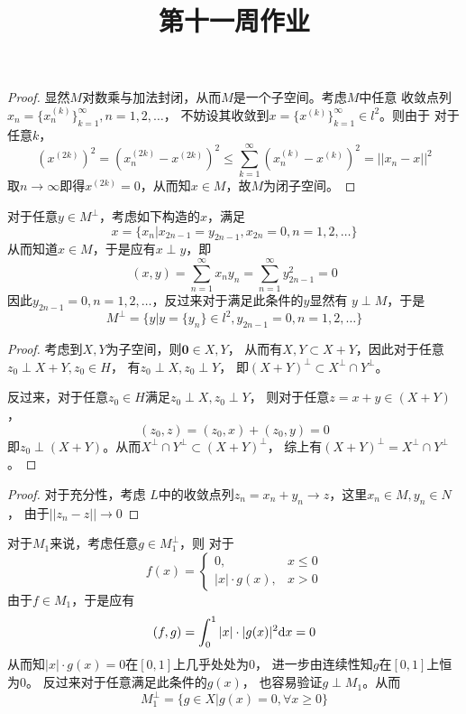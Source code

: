 \documentclass[cn]{homework}
\title{第十一周作业}
\begin{document}
    \maketitle

    \problem
    \begin{proof}
        显然$M$对数乘与加法封闭，从而$M$是一个子空间。考虑$M$中任意
        收敛点列$x_n=\{x_n^{(k)}\}_{k=1}^\infty,n=1,2,\ldots$，
        不妨设其收敛到$x=\{x^{(k)}\}_{k=1}^\infty\in l^2$。则由于
        对于任意$k$，
        \[\left(x^{(2k)}\right)^2=\left(x_n^{(2k)}-x^{(2k)}\right)^2
        \leq\sum_{k=1}^\infty \left(x_n^{(k)}-x^{(k)}\right)^2
        =||x_n-x||^2\]
        取$n\to\infty$即得$x^{(2k)}=0$，从而知$x\in M$，故$M$为闭子空间。
    \end{proof}

    对于任意$y\in M^\perp$，考虑如下构造的$x$，满足
    \[x=\{x_n|x_{2n-1}=y_{2n-1},x_{2n}=0,n=1,2,\ldots\}\]
    从而知道$x\in M$，于是应有$x\perp y$，即
    \[(x,y)=\sum_{n=1}^\infty x_ny_n=\sum_{n=1}^\infty y_{2n-1}^2=0\]
    因此$y_{2n-1}=0,n=1,2,\ldots$，反过来对于满足此条件的$y$显然有
    $y\perp M$，于是
    \[M^\perp=\{y|y=\{y_n\}\in l^2,y_{2n-1}=0,n=1,2,\ldots\}\]

    \problem
    \begin{proof}
        考虑到$X,Y$为子空间，则$\boldsymbol 0\in X,Y$，
        从而有$X,Y\subset X+Y$，因此对于任意$z_0\perp X+Y,z_0\in H$，
        有$z_0\perp X,z_0\perp Y$，
        即$(X+Y)^\perp\subset X^\perp\cap Y^\perp$。

        反过来，对于任意$z_0\in H$满足$z_0\perp X,z_0\perp Y$，
        则对于任意$z=x+y\in (X+Y)$，
        \[(z_0,z)=(z_0,x)+(z_0,y)=0\]
        即$z_0\perp (X+Y)$。从而$X^\perp\cap Y^\perp\subset (X+Y)^\perp$，
        综上有$(X+Y)^\perp=X^\perp\cap Y^\perp$。
    \end{proof}

    \problem
    \begin{proof}
        对于充分性，考虑
        $L$中的收敛点列$z_n=x_n+y_n\to z$，这里$x_n\in M,y_n\in N$，
        由于$||z_n-z||\to 0$

        
    \end{proof}

    \problem
    \newcommand{\cg}{\overline}
    对于$M_1$来说，考虑任意$g\in M_1^\perp$，则
    对于
    \[f(x)=\begin{cases}
        0,&x\leq 0\\
        |x|\cdot g(x),&x>0
    \end{cases}\]
    由于$f\in M_1$，于是应有
    \[(f,g)=\int_0^1|x|\cdot|g(x)|^2\mathrm d x=0\]
    从而知$|x|\cdot g(x)=0$在$[0,1]$上几乎处处为$0$，
    进一步由连续性知$g$在$[0,1]$上恒为$0$。
    反过来对于任意满足此条件的$g(x)$，
    也容易验证$g\perp M_1$。从而
    \[M_1^\perp=\{g\in X|g(x)=0,\forall x\geq 0\}\]
\end{document}

